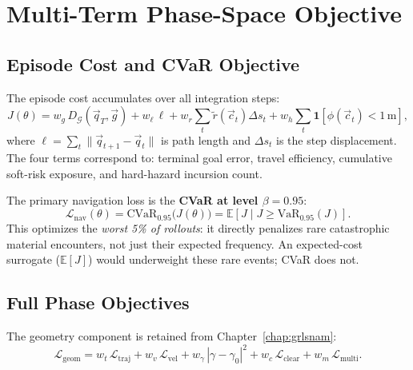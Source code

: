 \section{Multi-Term Phase-Space Objective}
\label{sec:ch4:objective}

\subsection{Episode Cost and CVaR Objective}
\label{subsec:ch4:cvar}

The episode cost accumulates over all integration steps:
\begin{equation}
  J(\theta)
  = w_g\,D_{\mathcal{G}}(\vec{q}_T,\vec{g})
  + w_\ell\,\ell
  + w_r\sum_t \tilde{r}(\vec{c}_t)\Delta s_t
  + w_h\sum_t \mathbf{1}[\phi(\vec{c}_t) < 1\,\text{m}],
  \label{eq:ch4:J}
\end{equation}
where $\ell = \sum_t \|\vec{q}_{t+1} - \vec{q}_t\|$ is path length and
$\Delta s_t$ is the step displacement.
The four terms correspond to: terminal goal error, travel efficiency,
cumulative soft-risk exposure, and hard-hazard incursion count.

The primary navigation loss is the \textbf{CVaR at level $\beta=0.95$}:
\begin{equation}
  \mathcal{L}_{\mathrm{nav}}(\theta)
  = \mathrm{CVaR}_{0.95}\!\bigl(J(\theta)\bigr)
  = \mathbb{E}\!\left[J \;\big|\; J \geq \mathrm{VaR}_{0.95}(J)\right].
  \label{eq:ch4:Lnav}
\end{equation}
This optimizes the \emph{worst 5\% of rollouts}: it directly penalizes
rare catastrophic material encounters, not just their expected frequency.
An expected-cost surrogate ($\mathbb{E}[J]$) would underweight these
rare events; CVaR does not.

\subsection{Full Phase Objectives}
\label{subsec:ch4:phase_obj}

The geometry component is retained from Chapter~\ref{chap:grlsnam}:
\begin{equation}
  \mathcal{L}_{\mathrm{geom}}
  = w_t\,\mathcal{L}_{\mathrm{traj}}
  + w_v\,\mathcal{L}_{\mathrm{vel}}
  + w_\gamma\,|\gamma - \gamma_0|^2
  + w_c\,\mathcal{L}_{\mathrm{clear}}
  + w_m\,\mathcal{L}_{\mathrm{multi}}.
  \label{eq:ch4:L_geom}
\end{equation}

